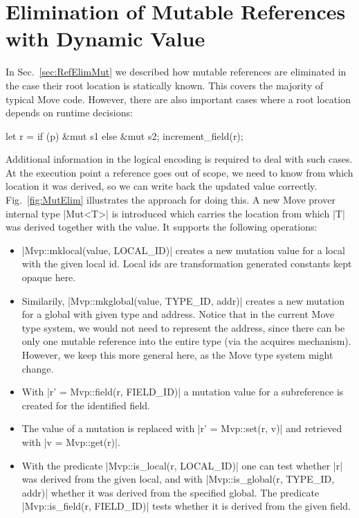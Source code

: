 \section{Elimination of Mutable References with Dynamic Value}
\label{sec:RefElimApx}

In Sec.~\ref{sec:RefElimMut} we described how mutable references are eliminated
in the case their root location is statically known. This covers the majority of
typical Move code.  However, there are also important cases where a root location
depends on runtime decisions:

\begin{Move}
  let r = if (p) &mut s1 else &mut s2;
  increment_field(r);
\end{Move}

\noindent Additional information in the logical encoding is required to deal
with such cases. At the execution point a reference goes out of scope, we need
to know from which location it was derived, so we can write back the updated
value correctly. Fig.~\ref{fig:MutElim} illustrates the approach for doing
this. A new Move prover internal type |Mut<T>| is introduced which carries the
location from which |T| was derived together with the value. It supports the
following operations:

\begin{itemize}
\item |Mvp::mklocal(value, LOCAL_ID)| creates a new mutation value for a local
  with the given local id.  Local ids are transformation generated constants
  kept opaque here.
\item Similarily, |Mvp::mkglobal(value, TYPE_ID, addr)| creates a new
  mutation for a global with given type and address. Notice that in the
    current Move type system, we would not need to represent the address, since
    there can be only one mutable reference into the entire type (via the
    acquires mechanism). However, we keep this more general here, as the Move
    type system might change.
\item With |r' = Mvp::field(r, FIELD_ID)| a mutation value for a subreference is
  created for the identified field.
\item The value of a mutation is replaced with |r' = Mvp::set(r, v)| and
  retrieved with |v = Mvp::get(r)|.
\item With the predicate |Mvp::is_local(r, LOCAL_ID)| one can test whether |r|
  was derived from the given local, and with |Mvp::is_global(r, TYPE_ID, addr)|
  whether it was derived from the specified global. The predicate
  |Mvp::is_field(r, FIELD_ID)| tests whether it is derived from the given field.
\end{itemize}

